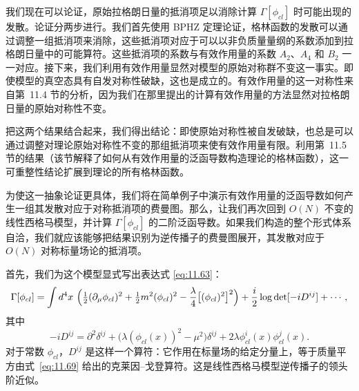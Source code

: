 我们现在可以论证，原始拉格朗日量的抵消项足以消除计算 $\Gamma[\phi_{cl}]$ 时可能出现的发散。论证分两步进行。我们首先使用 BPHZ 定理论证，格林函数的发散可以通过调整一组抵消项来消除，这些抵消项对应于可以以非负质量量纲的系数添加到拉格朗日量中的可能算符。这些抵消项的系数与有效作用量的系数 $A_2$、$A_4$ 和 $B_2$ 一一对应。接下来，我们利用有效作用量显然对模型的原始对称群不变这一事实。即使模型的真空态具有自发对称性破缺，这也是成立的。有效作用量的这一对称性来自第~11.4 节的分析，因为我们在那里提出的计算有效作用量的方法显然对拉格朗日量的原始对称性不变。

把这两个结果结合起来，我们得出结论：即使原始对称性被自发破缺，也总是可以通过调整对理论原始对称性不变的那组抵消项来使有效作用量有限。利用第~11.5 节的结果（该节解释了如何从有效作用量的泛函导数构造理论的格林函数），这一可重整性结论扩展到理论的所有格林函数。

为使这一抽象论证更具体，我们将在简单例子中演示有效作用量的泛函导数如何产生一组其发散对应于对称抵消项的费曼图。那么，让我们再次回到 $O(N)$ 不变的线性西格马模型，并计算 $\Gamma[\phi_{cl}]$ 的二阶泛函导数。如果我们构造的整个形式体系自洽，我们就应该能够把结果识别为逆传播子的费曼图展开，其发散对应于 $O(N)$ 对称标量场论的抵消项。

首先，我们为这个模型显式写出表达式 \eqref{eq:11.63}：
\begin{equation}
  \Gamma[\phi_{cl}] = \int d^4x\ \Bigl( \tfrac{1}{2}(\partial_\mu\phi_{cl})^2
    + \tfrac{1}{2}m^2(\phi_{cl})^2 - \frac{\lambda}{4}\bigl[ (\phi_{cl})^2
      \bigr]^2 \Bigr) + \frac{i}{2}\log\det[-iD^{ij}] + \cdots ,
  \label{eq:11.99}
\end{equation}
其中
\begin{equation}
  -iD^{ij} = \partial^2\delta^{ij} + \bigl( \lambda(\phi_{cl}(x))^2 - \mu^2
    \bigr)\delta^{ij} + 2\lambda\phi^i_{cl}(x)\phi^j_{cl}(x) .
  \label{eq:11.100}
\end{equation}
对于常数 $\phi_{cl}$，$D^{ij}$ 是这样一个算符：它作用在标量场的给定分量上，等于质量平方由式~\eqref{eq:11.69} 给出的克莱因--戈登算符。这是线性西格马模型逆传播子的领头阶近似。

